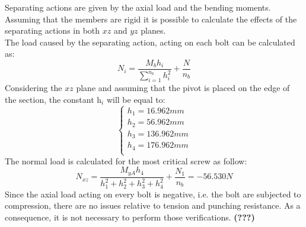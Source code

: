 Separating actions are given by the axial load and the bending moments.\\
Assuming that the members are rigid it is possible to calculate the effects of the separating actions in both $xz$ and $yz$ planes.\\
The load caused by the separating action, acting on each bolt can be calculated as:\\
\begin{equation*}
    N_{i} = \frac{M_{b}h_{i}}{\sum\limits_{i=1}^{n_{b}} h^2_{i}} + \frac{N}{n_{b}}
\end{equation*}
Considering the $xz$ plane and assuming that the pivot is placed on the edge of the section, the constant h$_{i}$ will be equal to:
\begin{equation*}
   \begin{cases}
    h_{1} = 16.962 mm\\
    h_{2} = 56.962 mm\\
    h_{3} = 136.962 mm\\
    h_{4} = 176.962 mm\\
    \end{cases} 
\end{equation*}
The normal load is calculated for the most critical screw as follow:\\
\begin{equation*}
    N_{xz} = \frac{M_{yA}h_{4}}{h_{1}^{2}+h_{2}^{2}+h_{3}^{2}+h_{4}^{2}} + \frac{N_{1}}{n_{b}} = - 56.530 N
\end{equation*}
Since the axial load acting on every bolt is negative, i.e. the bolt are subjected to compression, there are no issues relative to tension and punching resistance. As a consequence, it is not necessary to perform those verifications. \textbf{(???)}

